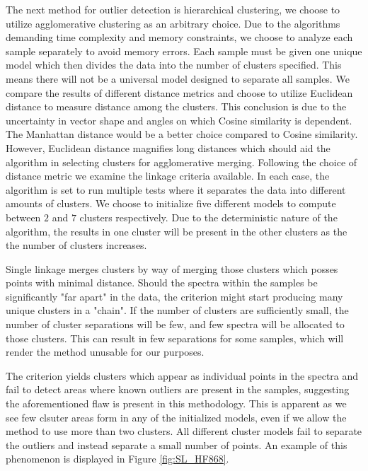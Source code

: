 The next method for outlier detection is hierarchical clustering, we choose to utilize agglomerative clustering as an arbitrary choice. Due to the algorithms demanding time complexity and memory constraints, we choose to analyze each sample separately to avoid memory errors. Each sample must be given one unique model which then divides the data into  the number of clusters specified. This means there will not be a universal model designed to separate all samples. We compare the results of different distance metrics and choose to utilize Euclidean distance to measure distance among the clusters. This conclusion is due to the uncertainty in vector shape and angles on which Cosine similarity is dependent. The Manhattan distance would be a better choice compared to Cosine similarity. However, Euclidean distance magnifies long distances which should aid the algorithm in selecting clusters for agglomerative merging. Following the choice of distance metric we examine the linkage criteria available. In each case, the algorithm is set to run multiple tests where it separates the data into different amounts of clusters. We choose to initialize five different models to compute between $2$ and $7$ clusters respectively. Due to the deterministic nature of the algorithm, the results in one cluster will be present in the other clusters as the the number of clusters increases.

Single linkage merges clusters by way of merging those clusters which posses points with minimal distance. Should the spectra within the samples be significantly "far apart" in the data, the criterion might start producing many unique clusters in a "chain". If the number of clusters are sufficiently small, the number of cluster separations will be few, and few spectra will be allocated to those clusters. This can result in few separations for some samples, which will render the method unusable for our purposes.

The criterion yields clusters which appear as individual points in the spectra and fail to detect areas where known outliers are present in the samples, suggesting the aforementioned flaw is present in this methodology. This is apparent as we see few clsuter areas form in any of the initialized models, even if we allow the method to use more than two clusters. All different cluster models fail to separate the outliers and instead separate a small number of points. An example of this phenomenon is displayed in Figure \ref{fig:SL_HF868}.

